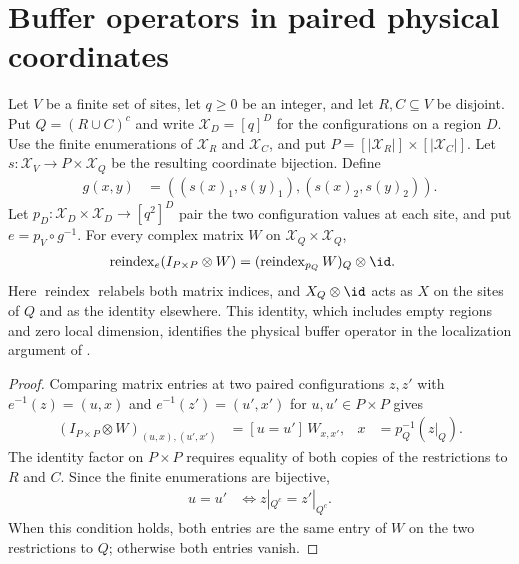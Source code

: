 \section{Buffer operators in paired physical coordinates}

\begin{lemma}
    \label{thm:peps_physical_buffer_coordinates}
    \leanok
    Let $V$ be a finite set of sites, let $q\ge0$ be an integer, and let
    $R,C\subseteq V$ be disjoint. Put $Q=(R\cup C)^c$ and write
    $\mathcal X_D=[q]^D$ for the configurations on a region $D$.
    Use the finite enumerations of $\mathcal X_R$ and
    $\mathcal X_C$, and put $P=[|\mathcal X_R|]\times[|\mathcal X_C|]$.
    Let $s:\mathcal X_V\to P\times\mathcal X_Q$ be the resulting
    coordinate bijection. Define
    \begin{align*}
        g(x,y) & =((s(x)_1,s(y)_1),(s(x)_2,s(y)_2)).
    \end{align*}
    Let $p_D:\mathcal X_D\times\mathcal X_D\to[q^2]^D$ pair the two
    configuration values at each site, and put $e=p_V\circ g^{-1}$.
    For every complex matrix $W$ on $\mathcal X_Q\times\mathcal X_Q$,
    \begin{align*}
        \operatorname{reindex}_e(I_{P\times P}\otimes W)
         & =(\operatorname{reindex}_{p_Q}W)_Q\otimes\id.
    \end{align*}
    Here $\operatorname{reindex}$ relabels both matrix indices, and
    $X_Q\otimes\id$ acts as $X$ on the sites of $Q$ and as the identity
    elsewhere. This identity, which includes empty regions and zero local
    dimension, identifies the physical buffer operator in the localization
    argument of \cite{OpenAI2026PolynomialPEPS}.
\end{lemma}
\begin{proof}\leanok
    Comparing matrix entries at two paired configurations $z,z'$ with
    $e^{-1}(z)=(u,x)$ and $e^{-1}(z')=(u',x')$ for $u,u'\in P\times P$ gives
    \begin{align*}
        (I_{P\times P}\otimes W)_{(u,x),(u',x')}
          & =[u=u']\,W_{x,x'}, &
        x & =p_Q^{-1}(z|_Q).
    \end{align*}
    The identity factor on $P\times P$ requires equality of both copies of
    the restrictions to $R$ and $C$. Since the finite enumerations are
    bijective,
    \begin{align*}
        u=u' & \iff z|_{Q^c}=z'|_{Q^c}.
    \end{align*}
    When this condition holds, both entries are the same entry of $W$ on
    the two restrictions to $Q$; otherwise both entries vanish.
\end{proof}
